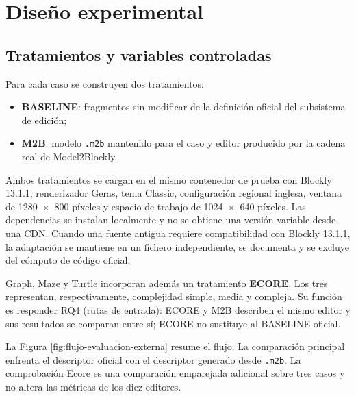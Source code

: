 \section{Diseño experimental}
\label{sec:diseno-experimental-blockly}

\subsection{Tratamientos y variables controladas}

Para cada caso se construyen dos tratamientos:

\begin{itemize}
  \item \textbf{BASELINE}: fragmentos sin modificar de la definición oficial
  del subsistema de edición;
  \item \textbf{M2B}: modelo \texttt{.m2b} mantenido para el caso y editor
  producido por la cadena real de Model2Blockly.
\end{itemize}

Ambos tratamientos se cargan en el mismo contenedor de prueba con Blockly
13.1.1, renderizador Geras, tema Classic, configuración regional inglesa, ventana de
1280~$\times$~800 píxeles y espacio de trabajo de 1024~$\times$~640 píxeles. Las
dependencias se instalan localmente y no se obtiene una versión variable desde
una CDN. Cuando una fuente antigua requiere compatibilidad con Blockly 13.1.1,
la adaptación se mantiene en un fichero independiente, se documenta y se
excluye del cómputo de código oficial.

Graph, Maze y Turtle incorporan además un tratamiento \textbf{ECORE}. Los tres
representan, respectivamente, complejidad simple, media y compleja. Su función
es responder RQ4 (rutas de entrada): ECORE y M2B describen el mismo editor y sus resultados se
comparan entre sí; ECORE no sustituye al BASELINE oficial.

La Figura \ref{fig:flujo-evaluacion-externa} resume el flujo. La comparación
principal enfrenta el descriptor oficial con el descriptor generado desde
\texttt{.m2b}. La comprobación Ecore es una comparación emparejada adicional
sobre tres casos y no altera las métricas de los diez editores.

